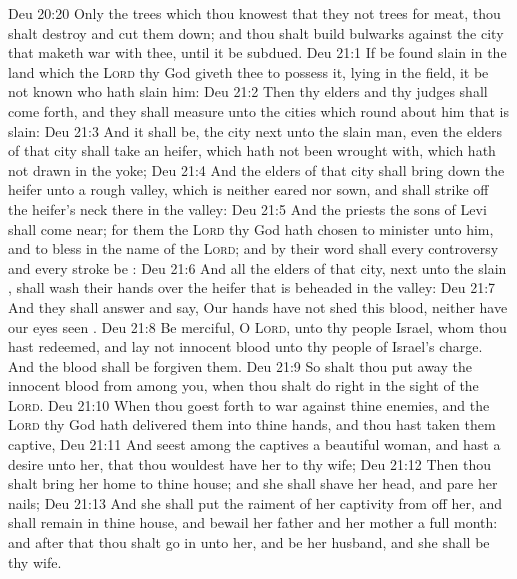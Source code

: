 \vs Deu 20:20 Only the trees which thou knowest that they  not trees for meat, thou shalt destroy and cut them down; and thou shalt build bulwarks against the city that maketh war with thee, until it be subdued.
\vs Deu 21:1 If  be found slain in the land which the \textsc{Lord} thy God giveth thee to possess it, lying in the field,  it be not known who hath slain him:
\vs Deu 21:2 Then thy elders and thy judges shall come forth, and they shall measure unto the cities which  round about him that is slain:
\vs Deu 21:3 And it shall be,  the city  next unto the slain man, even the elders of that city shall take an heifer, which hath not been wrought with,  which hath not drawn in the yoke;
\vs Deu 21:4 And the elders of that city shall bring down the heifer unto a rough valley, which is neither eared nor sown, and shall strike off the heifer's neck there in the valley:
\vs Deu 21:5 And the priests the sons of Levi shall come near; for them the \textsc{Lord} thy God hath chosen to minister unto him, and to bless in the name of the \textsc{Lord}; and by their word shall every controversy and every stroke be :
\vs Deu 21:6 And all the elders of that city,  next unto the slain , shall wash their hands over the heifer that is beheaded in the valley:
\vs Deu 21:7 And they shall answer and say, Our hands have not shed this blood, neither have our eyes seen .
\vs Deu 21:8 Be merciful, O \textsc{Lord}, unto thy people Israel, whom thou hast redeemed, and lay not innocent blood unto thy people of Israel's charge. And the blood shall be forgiven them.
\vs Deu 21:9 So shalt thou put away the  innocent blood from among you, when thou shalt do  right in the sight of the \textsc{Lord}.
\vs Deu 21:10 When thou goest forth to war against thine enemies, and the \textsc{Lord} thy God hath delivered them into thine hands, and thou hast taken them captive,
\vs Deu 21:11 And seest among the captives a beautiful woman, and hast a desire unto her, that thou wouldest have her to thy wife;
\vs Deu 21:12 Then thou shalt bring her home to thine house; and she shall shave her head, and pare her nails;
\vs Deu 21:13 And she shall put the raiment of her captivity from off her, and shall remain in thine house, and bewail her father and her mother a full month: and after that thou shalt go in unto her, and be her husband, and she shall be thy wife.
